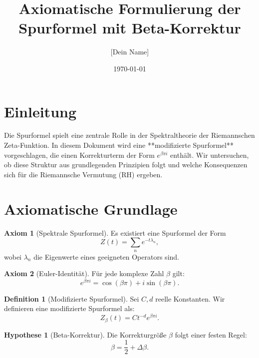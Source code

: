 \documentclass{article}
\title{Axiomatische Formulierung der Spurformel mit Beta-Korrektur}
\author{[Dein Name]}
\date{\today}
\theoremstyle{definition}
\newtheorem{axiom}{Axiom}
\newtheorem{hypothesis}{Hypothese}
\newtheorem{definition}{Definition}
\begin{document}
\maketitle

\section{Einleitung}

Die Spurformel spielt eine zentrale Rolle in der Spektraltheorie der Riemannschen Zeta-Funktion. 
In diesem Dokument wird eine **modifizierte Spurformel** vorgeschlagen, die einen Korrekturterm der Form \( e^{\beta \pi i} \) enthält. 
Wir untersuchen, ob diese Struktur aus grundlegenden Prinzipien folgt und welche Konsequenzen sich für die Riemannsche Vermutung (RH) ergeben.

\section{Axiomatische Grundlage}

\begin{axiom}[Spektrale Spurformel]
Es existiert eine Spurformel der Form
\begin{equation}
    Z(t) = \sum_n e^{- t \lambda_n},
\end{equation}
wobei \( \lambda_n \) die Eigenwerte eines geeigneten Operators sind.
\end{axiom}

\begin{axiom}[Euler-Identität]
Für jede komplexe Zahl \( \beta \) gilt:
\begin{equation}
    e^{\beta \pi i} = \cos(\beta \pi) + i \sin(\beta \pi).
\end{equation}
\end{axiom}

\begin{definition}[Modifizierte Spurformel]
Sei \( C, d \) reelle Konstanten. Wir definieren eine modifizierte Spurformel als:
\begin{equation}
    Z_{\beta}(t) = C t^{-d} e^{\beta \pi i}.
\end{equation}
\end{definition}

\begin{hypothesis}[Beta-Korrektur]
Die Korrekturgröße \( \beta \) folgt einer festen Regel:
\begin{equation}
    \beta = \frac{1}{2} + \Delta\beta.
\end{equation}
\end{hypothesis}
\end{document}
